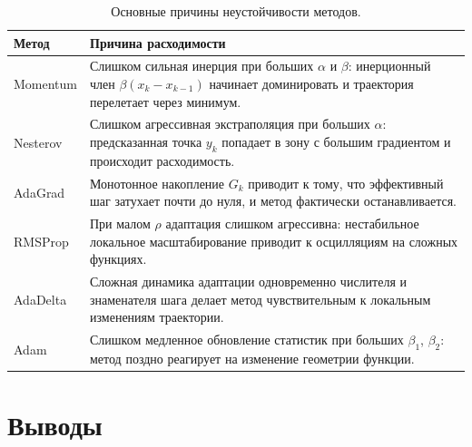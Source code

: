 \documentclass[a4paper,12pt]{article}
\begin{document}
\begin{table}[H]
\centering
\caption{Основные причины неустойчивости методов.}
\begin{tabular}{p{2.5cm} p{11cm}}
\toprule
Метод & Причина расходимости \\
\midrule

Momentum &
Слишком сильная инерция при больших $\alpha$ и $\beta$:
инерционный член $\beta(x_k-x_{k-1})$ начинает доминировать
и траектория перелетает через минимум. \\[4pt]

Nesterov &
Слишком агрессивная экстраполяция при больших $\alpha$:
предсказанная точка $y_k$ попадает в зону
с большим градиентом и происходит расходимость. \\[4pt]

AdaGrad &
Монотонное накопление $G_k$ приводит к тому,
что эффективный шаг затухает почти до нуля,
и метод фактически останавливается. \\[4pt]

RMSProp &
При малом $\rho$ адаптация слишком агрессивна:
нестабильное локальное масштабирование приводит
к осцилляциям на сложных функциях. \\[4pt]

AdaDelta &
Сложная динамика адаптации одновременно числителя
и знаменателя шага делает метод чувствительным
к локальным изменениям траектории. \\[4pt]

Adam &
Слишком медленное обновление статистик при больших
$\beta_1$, $\beta_2$: метод поздно реагирует на
изменение геометрии функции. \\

\bottomrule
\end{tabular}
\end{table}

\section{Выводы}
\end{document}
